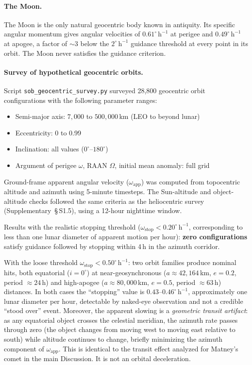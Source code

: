 \documentclass[11pt,a4paper]{article}
\begin{document}
\paragraph{The Moon.}
The Moon is the only natural geocentric body known in antiquity.
Its specific angular momentum gives angular velocities of
$0.61^\circ\,\mathrm{h}^{-1}$ at perigee and $0.49^\circ\,\mathrm{h}^{-1}$
at apogee, a factor of ${\sim}3$ below the $2^\circ\,\mathrm{h}^{-1}$
guidance threshold at every point in its orbit. The Moon never satisfies
the guidance criterion.

\paragraph{Survey of hypothetical geocentric orbits.}
Script \texttt{sob\_geocentric\_survey.py} surveyed 28,800 geocentric orbit
configurations with the following parameter ranges:
\begin{itemize}
  \item Semi-major axis: $7{,}000$ to $500{,}000$\,km (LEO to beyond lunar)
  \item Eccentricity: 0 to 0.99
  \item Inclination: all values ($0^\circ$--$180^\circ$)
  \item Argument of perigee $\omega$, RAAN $\Omega$, initial mean anomaly: full grid
\end{itemize}
Ground-frame apparent angular velocity ($\omega_\mathrm{app}$) was computed
from topocentric altitude and azimuth using 5-minute timesteps.
The Sun-altitude and object-altitude checks followed the same criteria as the
heliocentric survey (Supplementary~\S\,S1.5), using a 12-hour nighttime window.

Results with the realistic stopping threshold ($\omega_\mathrm{stop} <
0.20^\circ\,\mathrm{h}^{-1}$, corresponding to less than one lunar diameter
of apparent motion per hour): \textbf{zero configurations} satisfy guidance
followed by stopping within 4\,h in the azimuth corridor.

With the loose threshold $\omega_\mathrm{stop} < 0.50^\circ\,\mathrm{h}^{-1}$:
two orbit families produce nominal hits, both equatorial ($i = 0^\circ$) at
near-geosynchronous ($a \approx 42{,}164$\,km, $e = 0.2$, period $\approx 24$\,h)
and high-apogee ($a \approx 80{,}000$\,km, $e = 0.5$, period $\approx 63$\,h)
distances. In both cases the ``stopping'' value is $0.43$--$0.46^\circ\,\mathrm{h}^{-1}$,
approximately one lunar diameter per hour, detectable by naked-eye observation
and not a credible ``stood over'' event. Moreover, the apparent slowing is a
\emph{geometric transit artifact}: as any equatorial object crosses the
celestial meridian, the azimuth rate passes through zero (the object changes
from moving west to moving east relative to south) while altitude continues to
change, briefly minimizing the azimuth component of $\omega_\mathrm{app}$.
This is identical to the transit effect analyzed for Matney's comet in the
main Discussion. It is not an orbital deceleration.
\end{document}
